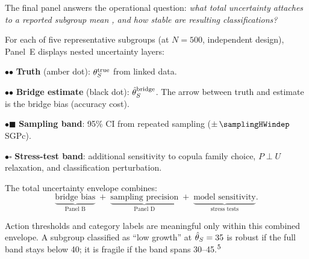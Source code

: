 \documentclass[10pt]{article}
\begin{document}
\noindent
\begin{minipage}[t]{3.75in}
  \vspace{0.05in}
  \hspace{0.15in}%
  \begin{minipage}{3.45in}
    \small\raggedright\color{bodyGrey}

    The final panel answers the operational question: \emph{what total
    uncertainty attaches to a reported subgroup mean \SGPc, and how stable
    are resulting classifications?}

    \vspace{4pt}
    For each of five representative subgroups (at $N = 500$,
    independent design), Panel~E displays nested uncertainty layers:

    \vspace{2pt}
    \hspace{5pt}$\bullet$\;\textcolor{truthAmber}{$\bullet$} \textbf{Truth}
    (amber dot): $\theta_S^{\mathrm{true}}$ from linked data.

    \vspace{1pt}
    \hspace{5pt}$\bullet$\;$\bullet$ \textbf{Bridge estimate} (black dot):
    $\hat{\theta}_S^{\mathrm{bridge}}$. The \textcolor{zissouRed}{arrow} between truth and
    estimate is the bridge bias (accuracy cost).

    \vspace{1pt}
    \hspace{5pt}$\bullet$\;\textcolor{samplingBlue}{$\blacksquare$}
    \textbf{Sampling band}: 95\% CI from repeated sampling
    ($\pm\,\samplingHWindep$ SGPc).

    \vspace{1pt}
    \hspace{5pt}$\bullet$\;\textcolor{stressOrange}{$\square$}
    \textbf{Stress-test band}: additional sensitivity to copula family choice,
    $P \perp U$ relaxation, and classification perturbation.

    \vspace{4pt}
    The total uncertainty envelope combines:
    \[
      \underbrace{\text{bridge bias}}_{\text{Panel B}}
      \;+\;
      \underbrace{\text{sampling precision}}_{\text{Panel D}}
      \;+\;
      \underbrace{\text{model sensitivity}}_{\text{stress tests}}.
    \]

    \vspace{4pt}
    Action thresholds and category labels are meaningful only within this
    combined envelope. A subgroup classified as ``low growth'' at
    $\hat{\theta}_S = 35$ is robust if the full band stays below 40; it is
    fragile if the band spans 30--45.$^{\mbox{\footnotesize{5}}}$

  \end{minipage}
  \vspace{0.1in}
\end{minipage}
\end{document}
